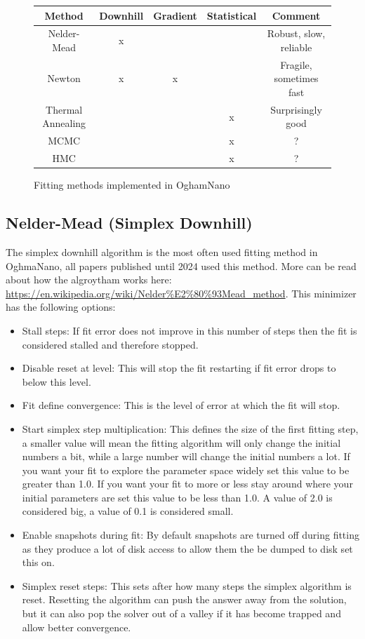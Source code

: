 \begin{figure}[H]
\begin{tabular}{||c c c c c||} 
 \hline
 Method 				& Downhill	& Gradient &  Statistical & Comment\\ 
 \hline\hline
 Nelder-Mead			& x 		& 			&    & Robust, slow, reliable\\ 
 \hline
 Newton					& x 		&	x		&    & Fragile, sometimes fast\\
 \hline
 Thermal Annealing		&  			&			&  x & Surprisingly good\\
 \hline
 MCMC					&  			&			&  x & ?\\
 \hline
 HMC					&  			&			&  x & ?\\ [1ex] 
 \hline
\end{tabular}
\caption{Fitting methods implemented in OghamNano}
\label{tab:fitting_methods}
\end{figure}

\subsection{Nelder-Mead (Simplex Downhill)}
The simplex downhill algorithm is the most often used fitting method in OghmaNano, all papers published until 2024 used this method. More can be read about how the algroytham works here: \url{https://en.wikipedia.org/wiki/Nelder%E2%80%93Mead_method}. This minimizer has the following options: 

\begin{itemize}
  \item Stall steps: If fit error does not improve in this number of steps then the fit is considered stalled and therefore stopped.
  \item Disable reset at level: This will stop the fit restarting if fit error drops to below this level.
  \item Fit define convergence: This is the level of error at which the fit will stop.
  \item Start simplex step multiplication:  This defines the size of the first fitting step, a smaller value will mean the fitting algorithm will only change the initial numbers a bit, while a large number will change the initial numbers a lot. If you want your fit to explore the parameter space widely set this value to be greater than 1.0. If you want your fit to more or less stay around where your initial parameters are set this value to be less than 1.0.  A value of 2.0 is considered big, a value of 0.1 is considered small.
  \item Enable snapshots during fit: By default snapshots are turned off during fitting as they produce a lot of disk access to allow them the be dumped to disk set this on.
  \item Simplex reset steps: This sets after how many steps the simplex algorithm is reset. Resetting the algorithm can push the answer away from the solution, but it can also pop the solver out of a valley if it has become trapped and allow better convergence.
\end{itemize}

